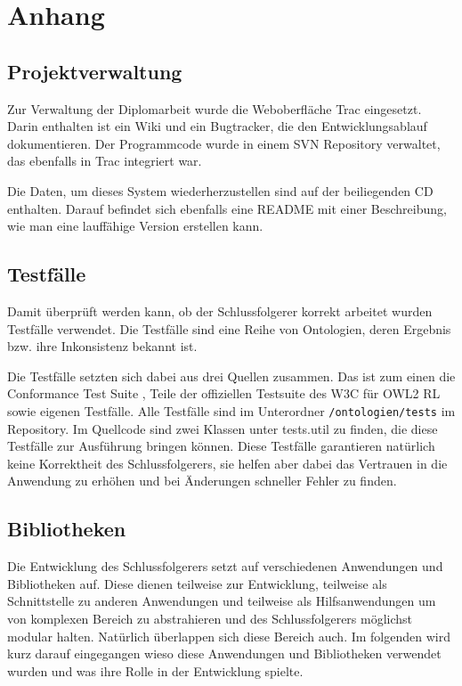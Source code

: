 \chapter{Anhang}

\section{Projektverwaltung}
Zur Verwaltung der Diplomarbeit wurde die Weboberfläche Trac eingesetzt. Darin enthalten ist ein Wiki und ein Bugtracker, die den Entwicklungsablauf dokumentieren. Der Programmcode wurde in einem SVN Repository verwaltet, das ebenfalls in Trac integriert war.

Die Daten, um dieses System wiederherzustellen sind auf der beiliegenden CD enthalten. Darauf befindet sich ebenfalls eine README mit einer Beschreibung, wie man eine lauffähige Version erstellen kann.

\section{Testfälle}
Damit überprüft werden kann, ob der Schlussfolgerer korrekt arbeitet wurden Testfälle verwendet. Die Testfälle sind eine Reihe von Ontologien, deren Ergebnis bzw. ihre Inkonsistenz bekannt ist.

Die Testfälle setzten sich dabei aus drei Quellen zusammen. Das ist zum einen die Conformance Test Suite \cite{Schneider2009}, Teile der offiziellen Testsuite des W3C für OWL2 RL \cite{SWTestcases} sowie eigenen Testfälle. Alle Testfälle sind im Unterordner \texttt{/ontologien/tests} im Repository. Im Quellcode sind zwei Klassen unter tests.util zu finden, die diese Testfälle zur Ausführung bringen können. Diese Testfälle garantieren natürlich keine Korrektheit des Schlussfolgerers, sie helfen aber dabei das Vertrauen in die Anwendung zu erhöhen und bei Änderungen schneller Fehler zu finden.

\section{Bibliotheken}
Die Entwicklung des Schlussfolgerers setzt auf verschiedenen Anwendungen und Bibliotheken auf. Diese dienen teilweise zur Entwicklung, teilweise als Schnittstelle zu anderen Anwendungen und teilweise als Hilfsanwendungen um von komplexen Bereich zu abstrahieren und des Schlussfolgerers möglichst modular halten. Natürlich überlappen sich diese Bereich auch. Im folgenden wird kurz darauf eingegangen wieso diese Anwendungen und Bibliotheken verwendet wurden und was ihre Rolle in der Entwicklung spielte.

